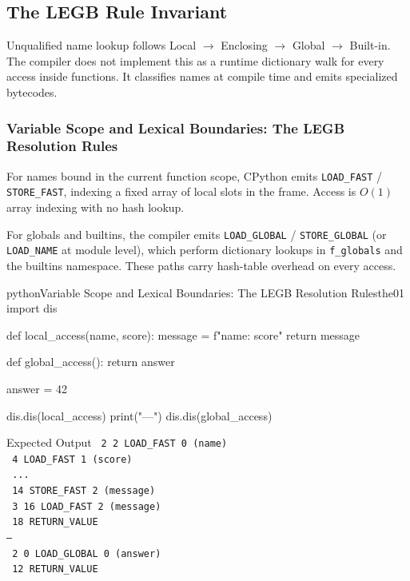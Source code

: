 \documentclass[a4paper,twoside]{report}
\begin{document}
\subsection{The LEGB Rule Invariant}

Unqualified name lookup follows Local $\rightarrow$ Enclosing $\rightarrow$ Global $\rightarrow$ Built-in. The compiler does not implement this as a runtime dictionary walk for every access inside functions. It classifies names at compile time and emits specialized bytecodes.

\subsubsection{Variable Scope and Lexical Boundaries: The LEGB Resolution Rules}

For names bound in the current function scope, CPython emits \texttt{LOAD\_FAST} / \texttt{STORE\_FAST}, indexing a fixed array of local slots in the frame. Access is $O(1)$ array indexing with no hash lookup.

For globals and builtins, the compiler emits \texttt{LOAD\_GLOBAL} / \texttt{STORE\_GLOBAL} (or \texttt{LOAD\_NAME} at module level), which perform dictionary lookups in \texttt{f\_globals} and the builtins namespace. These paths carry hash-table overhead on every access.

\begin{codebox}[]{python}{Variable Scope and Lexical Boundaries: The LEGB Resolution Rules}{the01}
import dis

def local_access(name, score):
    message = f"{name}: {score}"
    return message

def global_access():
    return answer

answer = 42

dis.dis(local_access)
print("---")
dis.dis(global_access)
\end{codebox}


\begin{iobox}{Expected Output}
\texttt{  2           2 LOAD\_FAST                0 (name)} \\
\texttt{              4 LOAD\_FAST                1 (score)} \\
\texttt{             ...} \\
\texttt{             14 STORE\_FAST               2 (message)} \\
\texttt{  3          16 LOAD\_FAST                2 (message)} \\
\texttt{             18 RETURN\_VALUE} \\
\texttt{---} \\
\texttt{  2           0 LOAD\_GLOBAL              0 (answer)} \\
\texttt{             12 RETURN\_VALUE} \\
\end{iobox}
\end{document}
